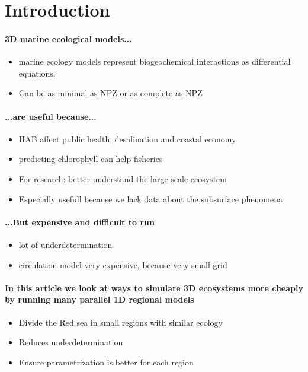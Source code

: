 \section{Introduction}

\paragraph{3D marine ecological models...}

\begin{itemize}
  \item marine ecology models represent biogeochemical interactions as
differential equations.
  \item Can be as minimal as NPZ or as complete as NPZ
\end{itemize}

\paragraph{...are useful because...}

\begin{itemize}
  \item HAB affect public health, desalination and coastal economy
  \item predicting chlorophyll can help fisheries
  \item For research: better understand the large-scale ecosystem
  \item Especially usefull because we lack data about the subsurface
phenomena
\end{itemize}

\paragraph{...But expensive and difficult to run}

\begin{itemize}
  \item \citep{Anderson2005} lot of underdetermination
  \item circulation model very expensive, because very small grid
\end{itemize}

\paragraph{In this article we look at ways to simulate 3D ecosystems more
cheaply by running many parallel 1D regional models}

\begin{itemize}
  \item Divide the Red sea in small regions with similar ecology
  \item Reduces underdetermination
  \item Ensure parametrization is better for each region
\end{itemize}

